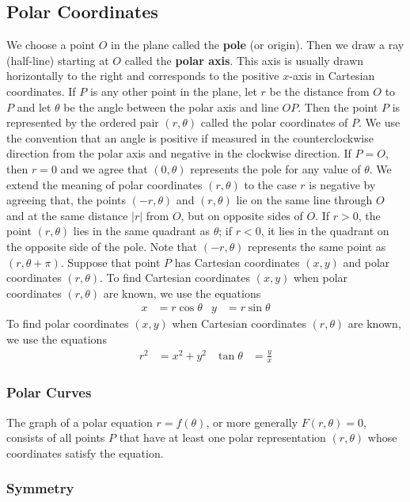 \subsection{Polar Coordinates}

We choose a point \(O\) in the plane called the \textbf{pole} (or origin).
Then we draw a ray (half-line) starting at \(O\) called the
\textbf{polar axis}.
This axis is usually drawn horizontally to the right and
corresponds to the positive \(x\)-axis in Cartesian coordinates.
If \(P\) is any other point in the plane, let \(r\) be the distance from \(O\)
to \(P\) and let \(\theta\) be the angle between the polar axis and line \(OP\).
Then the point \(P\) is represented by the ordered pair \((r,\theta)\) called
the polar coordinates of \(P\).
We use the convention that an angle is positive if measured in the
counterclockwise direction from the polar axis and negative in the clockwise
direction.
If \(P=O\), then \(r=0\) and we agree that \((0,\theta)\) represents the pole
for any value of \(\theta\).
We extend the meaning of polar coordinates \((r,\theta)\) to the case \(r\) is
negative by agreeing that, the points \((-r,\theta)\) and \((r,\theta)\) lie
on the same line through \(O\) and at the same distance \(|r|\) from \(O\),
but on opposite sides of \(O\).
If \(r>0\), the point \((r,\theta)\) lies in the same quadrant as \(\theta\);
if \(r<0\), it lies in the quadrant on the opposite side of the pole.
Note that \((-r,\theta)\) represents the same point as \((r,\theta+\pi)\).
Suppose that point \(P\) has Cartesian coordinates \((x,y)\) and polar
coordinates \((r,\theta)\).
To find Cartesian coordinates \((x,y)\) when polar coordinates \((r,\theta)\)
are known, we use the equations
\begin{align*}
    x &= r\cos\theta & y &= r\sin\theta
\end{align*}
To find polar coordinates \((x,y)\) when Cartesian coordinates \((r,\theta)\)
are known, we use the equations
\begin{align*}
    r^2 &= x^2+y^2 & \tan\theta &= \frac{y}{x}
\end{align*}

\subsubsection*{Polar Curves}
The graph of a polar equation \(r=f(\theta)\), or more generally
\(F(r,\theta)=0\), consists of all points \(P\) that have at least one polar
representation \((r,\theta)\) whose coordinates satisfy the equation.

\subsubsection*{Symmetry}